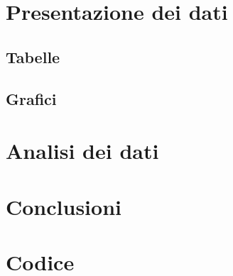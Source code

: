 \documentclass[11pt,a4paper]{article} %
\begin{document}
\section{Presentazione dei dati}			
	\subsection{Tabelle}
	
	\clearpage
	\subsection{Grafici}
	
\clearpage
\section{Analisi dei dati}
	

\section{Conclusioni}
	
	
\section{Codice}
	
	
\end{document}
